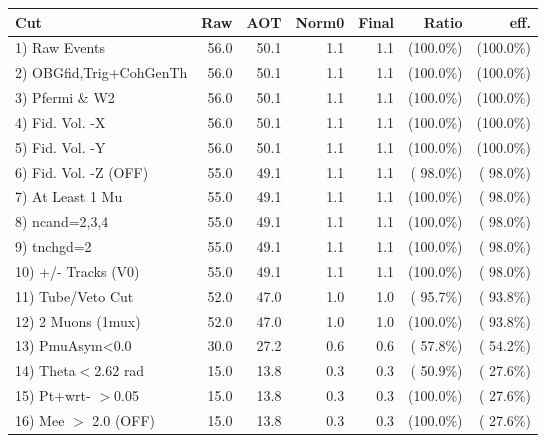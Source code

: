  \begin{table}[h!]\centering
 \begin{tabular}{||l||r|r|r|r|r|r||}
 \hline
 \hline
 Cut & Raw & AOT & Norm0 & Final & Ratio & eff.       \\
 \hline
  1) Raw Events           &         56.0 &         50.1 &          1.1 &          1.1 & (100.0\%) & (100.0\%) \\
  2) OBGfid,Trig+CohGenTh &         56.0 &         50.1 &          1.1 &          1.1 & (100.0\%) & (100.0\%) \\
  3) Pfermi \& W2         &         56.0 &         50.1 &          1.1 &          1.1 & (100.0\%) & (100.0\%) \\
  4) Fid. Vol. -X         &         56.0 &         50.1 &          1.1 &          1.1 & (100.0\%) & (100.0\%) \\
  5) Fid. Vol. -Y         &         56.0 &         50.1 &          1.1 &          1.1 & (100.0\%) & (100.0\%) \\
  6) Fid. Vol. -Z (OFF)   &         55.0 &         49.1 &          1.1 &          1.1 & ( 98.0\%) & ( 98.0\%) \\
  7) At Least 1 Mu        &         55.0 &         49.1 &          1.1 &          1.1 & (100.0\%) & ( 98.0\%) \\
  8) ncand=2,3,4          &         55.0 &         49.1 &          1.1 &          1.1 & (100.0\%) & ( 98.0\%) \\
  9) tnchgd=2             &         55.0 &         49.1 &          1.1 &          1.1 & (100.0\%) & ( 98.0\%) \\
 10) +/- Tracks (V0)      &         55.0 &         49.1 &          1.1 &          1.1 & (100.0\%) & ( 98.0\%) \\
 11) Tube/Veto Cut        &         52.0 &         47.0 &          1.0 &          1.0 & ( 95.7\%) & ( 93.8\%) \\
 12) 2 Muons (1mux)       &         52.0 &         47.0 &          1.0 &          1.0 & (100.0\%) & ( 93.8\%) \\
 13) PmuAsym<0.0          &         30.0 &         27.2 &          0.6 &          0.6 & ( 57.8\%) & ( 54.2\%) \\
 14) Theta$<$2.62 rad     &         15.0 &         13.8 &          0.3 &          0.3 & ( 50.9\%) & ( 27.6\%) \\
 15) Pt+wrt- $>$0.05      &         15.0 &         13.8 &          0.3 &          0.3 & (100.0\%) & ( 27.6\%) \\
 16) Mee $>$ 2.0  (OFF)   &         15.0 &         13.8 &          0.3 &          0.3 & (100.0\%) & ( 27.6\%) \\

\end{tabular}
\end{table}

